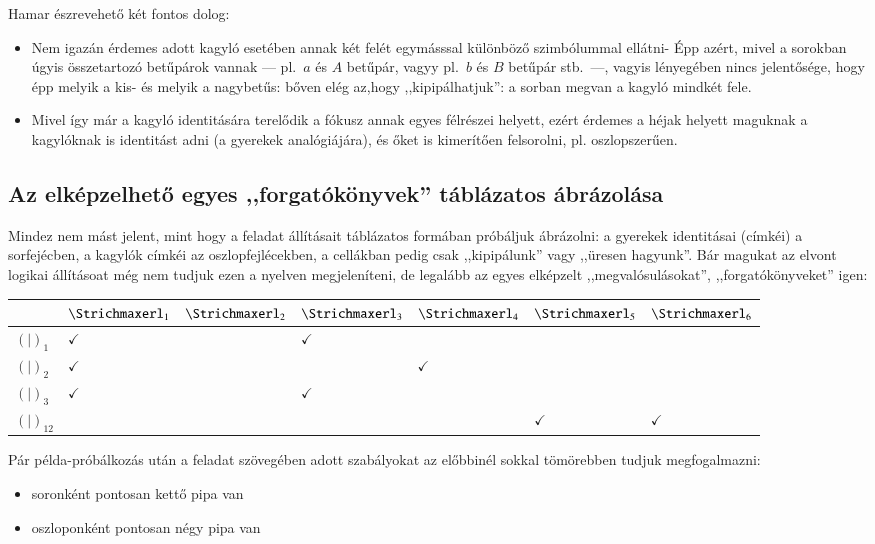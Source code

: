 \documentclass{article}
\newcommand{\she}[1]{\ensuremath{\Strichmaxerl_{#1}}}
\newcommand{\oys}[1]{\ensuremath{(\!|\!)_{#1}}}
\newcommand{\chm}{$\checkmark$}
\begin{document}
	Hamar észrevehető két fontos dolog:
	\begin{itemize}
		\item Nem igazán érdemes adott kagyló esetében annak két felét egymásssal különböző szimbólummal ellátni- Épp azért, mivel a sorokban úgyis összetartozó betűpárok vannak --- pl.\ $a$ és $A$ betűpár, vagyy pl.\ $b$ és $B$ betűpár stb.\ ---, vagyis lényegében nincs jelentősége, hogy épp melyik a kis- és melyik a nagybetűs: bőven elég az,hogy ,,kipipálhatjuk'': a sorban megvan a kagyló mindkét fele.
		\item Mivel így már a kagyló identitására terelődik a fókusz annak egyes félrészei helyett, ezért érdemes a héjak helyett maguknak a kagylóknak is identitást adni (a gyerekek analógiájára), és őket is kimerítően felsorolni, pl. oszlopszerűen.
	\end{itemize}

	\subsection{Az elképzelhető egyes ,,forgatókönyvek'' táblázatos ábrázolása}

	Mindez nem mást jelent, mint hogy a feladat állításait táblázatos formában próbáljuk ábrázolni: a gyerekek identitásai (címkéi) a sorfejécben, a kagylók címkéi az oszlopfejlécekben, a cellákban pedig csak ,,kipipálunk'' vagy ,,üresen hagyunk''.
	Bár magukat az elvont logikai állításoat még nem tudjuk ezen a nyelven megjeleníteni, de legalább az egyes elképzelt ,,megvalósulásokat'', ,,forgatókönyveket'' igen:

	\begin{tabular}{l||l|l|l|l|l|l|}
		         & $\she1$ & $\she2$ & $\she3$ & $\she4$ & $\she5$ & $\she6$\\\hline\hline
		$\oys1$    & \chm  &       & \chm  &       &       &      \\\hline
		$\oys2$    & \chm  &       &       & \chm  &       &      \\\hline
		$\oys3$    & \chm  &       & \chm  &       &       &      \\\hline\hline\hline\hline
		$\oys{12}$ &       &       &       &       & \chm  & \chm \\\hline
	\end{tabular}

	Pár példa-próbálkozás után a feladat szövegében adott szabályokat az előbbinél sokkal tömörebben tudjuk megfogalmazni:
	\begin{itemize}
		\item soronként pontosan kettő pipa van
		\item oszloponként pontosan négy pipa van
	\end{itemize}
\end{document}
